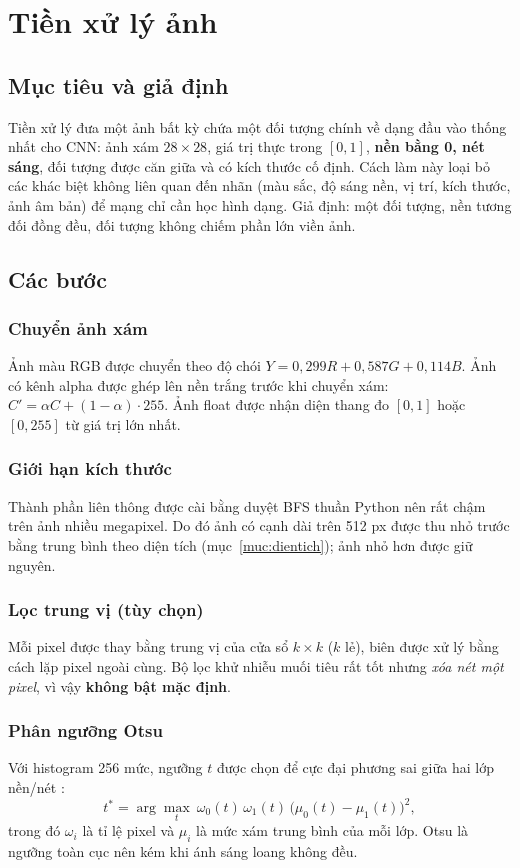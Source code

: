 \chapter{Tiền xử lý ảnh}
\label{chuong:tienxuly}

\section{Mục tiêu và giả định}
Tiền xử lý đưa một ảnh bất kỳ chứa một đối tượng chính về dạng đầu vào thống nhất cho CNN: ảnh xám $28\times28$, giá trị thực trong $[0,1]$,
\textbf{nền bằng 0, nét sáng}, đối tượng được căn giữa và có kích thước cố định. Cách làm này loại bỏ các khác biệt không liên quan đến nhãn (màu sắc, độ sáng nền,
vị trí, kích thước, ảnh âm bản) để mạng chỉ cần học hình dạng. Giả định: một đối tượng, nền tương đối đồng đều, đối tượng không chiếm phần lớn viền ảnh.

\section{Các bước}

\subsection{Chuyển ảnh xám}
Ảnh màu RGB được chuyển theo độ chói $Y = 0{,}299R + 0{,}587G + 0{,}114B$. Ảnh có kênh alpha được ghép lên nền trắng trước khi chuyển xám:
$C' = \alpha C + (1-\alpha)\cdot 255$. Ảnh float được nhận diện thang đo $[0,1]$ hoặc $[0,255]$ từ giá trị lớn nhất.

\subsection{Giới hạn kích thước}
Thành phần liên thông được cài bằng duyệt BFS thuần Python nên rất chậm trên ảnh nhiều megapixel. Do đó ảnh có cạnh dài trên 512 px được thu nhỏ trước
bằng trung bình theo diện tích (mục~\ref{muc:dientich}); ảnh nhỏ hơn được giữ nguyên.

\subsection{Lọc trung vị (tùy chọn)}
Mỗi pixel được thay bằng trung vị của cửa sổ $k\times k$ ($k$ lẻ), biên được xử lý bằng cách lặp pixel ngoài cùng. Bộ lọc khử nhiễu muối tiêu rất tốt nhưng
\emph{xóa nét một pixel}, vì vậy \textbf{không bật mặc định}.

\subsection{Phân ngưỡng Otsu}
Với histogram 256 mức, ngưỡng $t$ được chọn để cực đại phương sai giữa hai lớp nền/nét \cite{otsu1979}:
\begin{equation}
t^{*}=\arg\max_{t}\ \omega_0(t)\,\omega_1(t)\,\bigl(\mu_0(t)-\mu_1(t)\bigr)^2 ,
\end{equation}
trong đó $\omega_i$ là tỉ lệ pixel và $\mu_i$ là mức xám trung bình của mỗi lớp. Otsu là ngưỡng toàn cục nên kém khi ánh sáng loang không đều.

